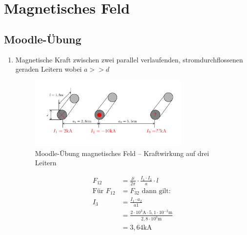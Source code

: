 \section{Magnetisches Feld}
\subsection{Moodle-Übung}
\begin{enumerate}
  \item Magnetische Kraft zwischen zwei parallel verlaufenden, stromdurchflossenen geraden Leitern wobei $a >> d$
        \begin{figure}[h!]
          \begin{center}
            \includegraphics[width=0.75\textwidth]{img/Magnetisches-Feld/A1.png}
          \end{center}
          \caption{Moodle-Übung magnetisches Feld – Kraftwirkung auf drei Leitern}
        \end{figure}
        \begin{align*}
          F_{12}             & = \frac{\mu}{2\pi}\cdot \frac{I_1\cdot I_2}{a}\cdot l                                 \\
          \text{Für } F_{12} & = F_{32} \text{ dann gilt:}                                                           \\
          I_3                & = \frac{I_1\cdot a_2}{a1}                                                             \\
                             & = \frac{2\cdot 10^{3}\text{A}\cdot 5,1\cdot 10^{-2}\text{m}}{2,8\cdot 10^{3}\text{m}} \\
                             & = 3,64\text{kA}                                                                       \\
        \end{align*}


\end{enumerate}
